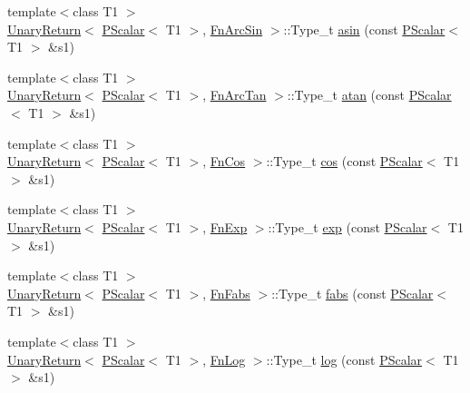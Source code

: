 \begin{DoxyCompactItemize}
\item 
{\footnotesize template$<$class T1 $>$ }\\\mbox{\hyperlink{structENSEM_1_1UnaryReturn}{Unary\+Return}}$<$ \mbox{\hyperlink{classENSEM_1_1PScalar}{P\+Scalar}}$<$ T1 $>$, \mbox{\hyperlink{structENSEM_1_1FnArcSin}{Fn\+Arc\+Sin}} $>$\+::Type\+\_\+t \mbox{\hyperlink{group__primscalar_ga66e19f88731b0ca161e7ecb7a3d4ea94}{asin}} (const \mbox{\hyperlink{classENSEM_1_1PScalar}{P\+Scalar}}$<$ T1 $>$ \&s1)
\item 
{\footnotesize template$<$class T1 $>$ }\\\mbox{\hyperlink{structENSEM_1_1UnaryReturn}{Unary\+Return}}$<$ \mbox{\hyperlink{classENSEM_1_1PScalar}{P\+Scalar}}$<$ T1 $>$, \mbox{\hyperlink{structENSEM_1_1FnArcTan}{Fn\+Arc\+Tan}} $>$\+::Type\+\_\+t \mbox{\hyperlink{group__primscalar_gad0db281b26948d9de5a2de123a357fe5}{atan}} (const \mbox{\hyperlink{classENSEM_1_1PScalar}{P\+Scalar}}$<$ T1 $>$ \&s1)
\item 
{\footnotesize template$<$class T1 $>$ }\\\mbox{\hyperlink{structENSEM_1_1UnaryReturn}{Unary\+Return}}$<$ \mbox{\hyperlink{classENSEM_1_1PScalar}{P\+Scalar}}$<$ T1 $>$, \mbox{\hyperlink{structENSEM_1_1FnCos}{Fn\+Cos}} $>$\+::Type\+\_\+t \mbox{\hyperlink{group__primscalar_ga0d6f04344bee0fa65f96047c4c9e2fa3}{cos}} (const \mbox{\hyperlink{classENSEM_1_1PScalar}{P\+Scalar}}$<$ T1 $>$ \&s1)
\item 
{\footnotesize template$<$class T1 $>$ }\\\mbox{\hyperlink{structENSEM_1_1UnaryReturn}{Unary\+Return}}$<$ \mbox{\hyperlink{classENSEM_1_1PScalar}{P\+Scalar}}$<$ T1 $>$, \mbox{\hyperlink{structENSEM_1_1FnExp}{Fn\+Exp}} $>$\+::Type\+\_\+t \mbox{\hyperlink{group__primscalar_ga82558f162d1959eca11c01ad753fc3a1}{exp}} (const \mbox{\hyperlink{classENSEM_1_1PScalar}{P\+Scalar}}$<$ T1 $>$ \&s1)
\item 
{\footnotesize template$<$class T1 $>$ }\\\mbox{\hyperlink{structENSEM_1_1UnaryReturn}{Unary\+Return}}$<$ \mbox{\hyperlink{classENSEM_1_1PScalar}{P\+Scalar}}$<$ T1 $>$, \mbox{\hyperlink{structENSEM_1_1FnFabs}{Fn\+Fabs}} $>$\+::Type\+\_\+t \mbox{\hyperlink{group__primscalar_ga974d25e3b2bee6a839ad06b019932122}{fabs}} (const \mbox{\hyperlink{classENSEM_1_1PScalar}{P\+Scalar}}$<$ T1 $>$ \&s1)
\item 
{\footnotesize template$<$class T1 $>$ }\\\mbox{\hyperlink{structENSEM_1_1UnaryReturn}{Unary\+Return}}$<$ \mbox{\hyperlink{classENSEM_1_1PScalar}{P\+Scalar}}$<$ T1 $>$, \mbox{\hyperlink{structENSEM_1_1FnLog}{Fn\+Log}} $>$\+::Type\+\_\+t \mbox{\hyperlink{group__primscalar_ga4793657c8e42b217f973ede3c83b71d7}{log}} (const \mbox{\hyperlink{classENSEM_1_1PScalar}{P\+Scalar}}$<$ T1 $>$ \&s1)

\end{DoxyCompactItemize}
